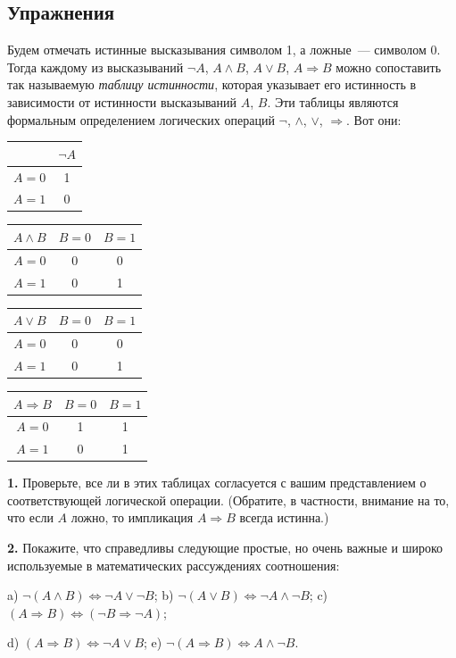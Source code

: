 \subsection*{Упражнения}

Будем отмечать истинные высказывания символом 1, а ложные~--- символом 0. Тогда каждому из высказываний $\neg A$, $A \land B$, $A \lor B$, $A \Rightarrow B$ можно сопоставить так называемую \emph{таблицу истинности}, которая указывает его истинность в зависимости от истинности высказываний $A$, $B$. Эти таблицы являются формальным определением логических операций $\neg$, $\land$, $\lor$, $\Rightarrow$. Вот они:

\begin{center}
\begin{tabular}{c|c}
 & $\neg A$ \\ \hline
$A=0$ & 1 \\
$A=1$ & 0
\end{tabular}
\qquad
\begin{tabular}{c|cc}
$A \land B$ & $B=0$ & $B=1$ \\ \hline
$A=0$ & 0 & 0 \\
$A=1$ & 0 & 1
\end{tabular}
\qquad
\begin{tabular}{c|cc}
$A \lor B$ & $B=0$ & $B=1$ \\ \hline
$A=0$ & 0 & 0 \\
$A=1$ & 0 & 1
\end{tabular}
\qquad
\begin{tabular}{c|cc}
$A \Rightarrow B$ & $B=0$ & $B=1$ \\ \hline
$A=0$ & 1 & 1 \\
$A=1$ & 0 & 1
\end{tabular}
\end{center}

\textbf{1.} Проверьте, все ли в этих таблицах согласуется с вашим представлением о соответствующей логической операции. (Обратите, в частности, внимание на то, что если $A$ ложно, то импликация $A \Rightarrow B$ всегда истинна.)

\textbf{2.} Покажите, что справедливы следующие простые, но очень важные и широко используемые в математических рассуждениях соотношения:

a) $\neg(A \land B) \Leftrightarrow \neg A \lor \neg B$; \qquad b) $\neg(A \lor B) \Leftrightarrow \neg A \land \neg B$; \qquad c) $(A \Rightarrow B) \Leftrightarrow (\neg B \Rightarrow \neg A)$;

d) $(A \Rightarrow B) \Leftrightarrow \neg A \lor B$; \qquad e) $\neg(A \Rightarrow B) \Leftrightarrow A \land \neg B$.
